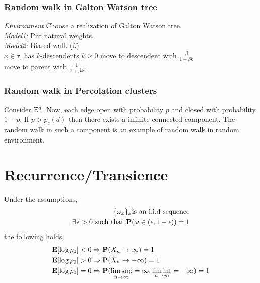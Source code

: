 \documentclass[main]{subfiles}
\begin{document}
\subsubsection{Random walk in Galton Watson tree}

\emph{Environment} Choose a realization of Galton Watson tree.\\
\emph{Model1:} Put natural weights.\\
\emph{Model2:} Biased walk ($\beta$)\\
$x\in \tau$, has $k$-descendents $k\geq0$
move to descendent with $\frac{\beta}{1+\beta k}$\\
move to parent with $\frac{1}{1+\beta k}$.

\subsubsection{Random walk in Percolation clusters}
Consider $\Z^d$. Now, each edge open with probability $p$ and closed with probability $1-p$. If $p>p_c(d)$ then there exists a infinite connected component. The random walk in such a component is an example of random walk in random environment.

\section{Recurrence/Transience}

\begin{theorem}[1975, Solomon]
	Under the assumptions,
	\begin{align}
		\{\omega_x\}_{x} \text{is an i.i.d sequence} \\
		\exists\,\epsilon > 0\,\, \text{such that}\,\, \P(\omega \in (\epsilon,1-\epsilon))=1
	\end{align}
	the following holds,
	\begin{align*}
		\E[\log \rho_{0}] < 0 & \Rightarrow \P(X_n \to \infty) = 1                                                    \\
		\E[\log \rho_{0}] > 0 & \Rightarrow \P(X_n \to -\infty) = 1                                                   \\
		\E[\log \rho_{0}] = 0 & \Rightarrow \P(\limsup_{n \to \infty} = \infty, \liminf_{n \to \infty} = -\infty) = 1
	\end{align*}
\end{theorem}
\end{document}
